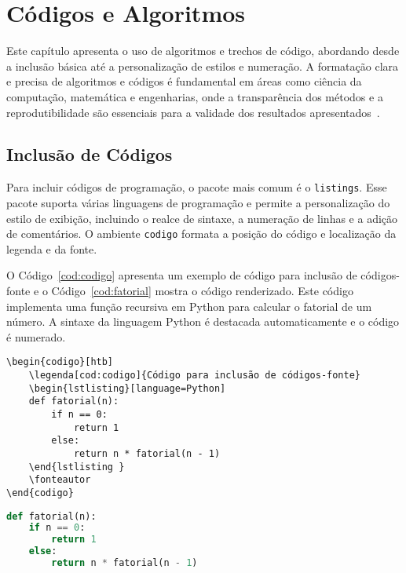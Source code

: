 \documentclass[
    12pt
    ,oneside
    ,a4paper
    ,chapter=TITLE
    ,section=TITLE
    ,sumario=abnt-6027-2012]{abntex2}
\begin{document}
\chapter{Códigos e Algoritmos}
\label{cap:codigos}

Este capítulo apresenta o uso de algoritmos e trechos de código, abordando desde a inclusão básica até a personalização de estilos e numeração. A formatação clara e precisa de algoritmos e códigos é fundamental em áreas como ciência da computação, matemática e engenharias, onde a transparência dos métodos e a reprodutibilidade são essenciais para a validade dos resultados apresentados~\cite{knuth1984texbook}.


\section{Inclusão de Códigos}

Para incluir códigos de programação, o pacote mais comum é o \texttt{listings}. Esse pacote suporta várias linguagens de programação e permite a personalização do estilo de exibição, incluindo o realce de sintaxe, a numeração de linhas e a adição de comentários. O ambiente \texttt{codigo} formata a posição do código e localização da legenda e da fonte.

O Código~\ref{cod:codigo} apresenta um exemplo de código para inclusão de códigos-fonte e o Código~\ref{cod:fatorial} mostra o código renderizado.
Este código implementa uma função recursiva em Python para calcular o fatorial de um número. A sintaxe da linguagem Python é destacada automaticamente e o código é numerado.

\begin{codigo}[htb]
\begin{lstlisting}
\begin{codigo}[htb]
    \legenda[cod:codigo]{Código para inclusão de códigos-fonte}
    \begin{lstlisting}[language=Python]
    def fatorial(n):
        if n == 0:
            return 1
        else:
            return n * fatorial(n - 1)
    \end{lstlisting }
    \fonteautor
\end{codigo}
\end{lstlisting}
\fonteautor
\end{codigo}

\begin{codigo}[htb]
\begin{lstlisting}[language=Python]
def fatorial(n):
    if n == 0:
        return 1
    else:
        return n * fatorial(n - 1)
\end{lstlisting}
\fonteautor
\end{codigo}
\end{document}
